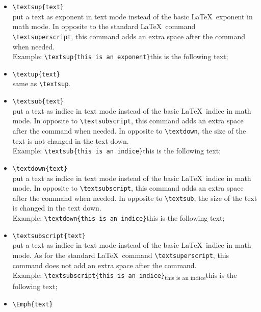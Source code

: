 \documentclass[book,taskpackage,specpackage,codepackage]{upmethodology-document}
\begin{document}
\begin{itemize}
\item \texttt{{\textbackslash}textsup\{text\}} \\
	put a text as exponent in text mode instead of the basic \LaTeX\ exponent in math mode. In opposite to the standard \LaTeX\ command \texttt{{\textbackslash}textsuperscript}, this command adds an extra space after the command when needed. \\
	Example: \texttt{{\textbackslash}textsup\{this is an exponent\}}this is the following text;
\item \texttt{{\textbackslash}textup\{text\}} \\
	same as \texttt{{\textbackslash}textsup}.
\item \texttt{{\textbackslash}textsub\{text\}} \\
	put a text as indice in text mode instead of the basic \LaTeX\ indice in math mode. In opposite to \texttt{{\textbackslash}textsubscript}, this command adds an extra space after the command when needed. In opposite to \texttt{{\textbackslash}textdown}, the size of the text is not changed in the text down. \\
	Example: \texttt{{\textbackslash}textsub\{this is an indice\}}this is the following text;
\item \texttt{{\textbackslash}textdown\{text\}} \\
	put a text as indice in text mode instead of the basic \LaTeX\ indice in math mode. In opposite to \texttt{{\textbackslash}textsubscript}, this command adds an extra space after the command when needed. In opposite to \texttt{{\textbackslash}textsub}, the size of the text is changed in the text down. \\
	Example: \texttt{{\textbackslash}textdown\{this is an indice\}}this is the following text;
\item \texttt{{\textbackslash}textsubscript\{text\}} \\
	put a text as indice in text mode instead of the basic \LaTeX\ indice in math mode. As for the standard \LaTeX\ command \texttt{{\textbackslash}textsuperscript}, this command does not add an extra space after the command. \\
	Example: \texttt{{\textbackslash}textsubscript\{this is an indice\}}\textsubscript{this is an indice}this is the following text;
\item \texttt{{\textbackslash}Emph\{text\}} \\

\end{itemize}
\end{document}
